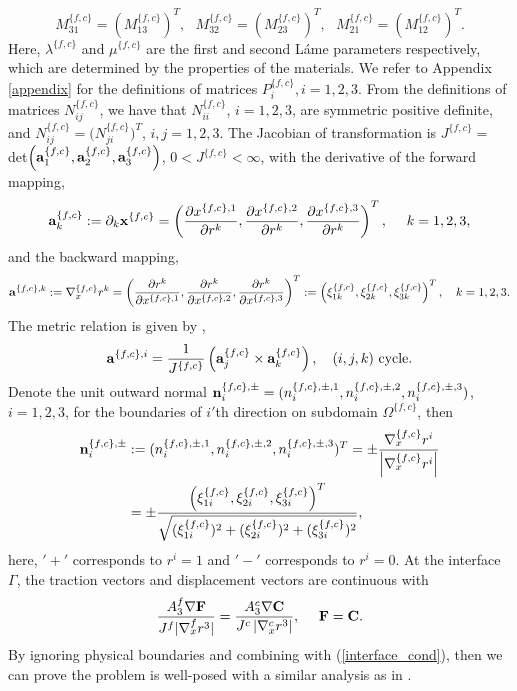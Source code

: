 \[ M_{31}^{\{f,c\}} = (M_{13}^{\{f,c\}})^T, \ \ \  M_{32}^{\{f,c\}} =(M_{23}^{\{f,c\}})^T, \ \ \ M_{21}^{\{f,c\}} =(M_{12}^{\{f,c\}})^T.\]
Here, $\lambda^{\{f,c\}}$ and $\mu^{\{f,c\}}$ are the first and second L{\' {a}}me parameters respectively, which are determined by the properties of the materials. We refer to Appendix \ref{appendix} for the definitions of matrices $P_i^{\{f,c\}}, i = 1,2,3$. From the definitions of matrices $N_{ij}^{\{f,c\}}$, we have that $N_{ii}^{\{f,c\}}$, $i = 1,2,3$, are symmetric positive definite, and $N_{ij}^{\{f,c\}}=\big(N_{ji}^{\{f,c\}}\big)^T$, $i,j=1,2,3$. The Jacobian of transformation is $J^{\{f,c\}} =$ det$\left({\bf a}^{\{f,c\}}_1,{\bf a}^{\{f,c\}}_2,{\bf a}^{\{f,c\}}_3\right)$, $0<J^{\{f,c\}}<\infty$, with the derivative of the forward mapping, 
\begin{equation*}
{\bf a}_k^{\{f,c\}} := \partial_k{\bf x}^{\{f,c\}}  = \left(\frac{\partial x^{\{f,c\},1}}{\partial r^{k}},\frac{\partial x^{\{f,c\},2}}{\partial r^{k}},\frac{\partial x^{\{f,c\},3}}{\partial r^{k}}\right)^T,\ \ \ \ k = 1,2,3,
\end{equation*}
and the backward mapping,
\begin{equation*}
{\bf a}^{\{f,c\},k} := \nabla_x^{\{f,c\}} r^{k} = \left(\frac{\partial r^{k}}{\partial x^{\{f,c\},1}},\frac{\partial r^{k}}{\partial x^{\{f,c\},2}},\frac{\partial r^{k}}{\partial x^{\{f,c\},3}}\right)^T := \left(\xi_{1k}^{\{f,c\}},\xi_{2k}^{\{f,c\}},\xi_{3k}^{\{f,c\}}\right)^T,\ \ \ k = 1,2,3.
\end{equation*}
 The metric relation is given by \cite{thompson1985numerical},
\begin{equation*}
{\bf a}^{\{f,c\},i} = \frac{1}{J^{\{f,c\}}}\left({\bf a}_j^{\{f,c\}}\times{\bf a}_k^{\{f,c\}}\right), \ \ \ (i,j,k) \ \mbox{cycle}.
\end{equation*}
Denote the unit outward normal ${\bf n}_i^{\{f,c\},\pm} = (n_i^{\{f,c\},\pm,1},n_i^{\{f,c\},\pm,2},n_i^{\{f,c\},\pm,3})$, $i = 1,2,3$, for the boundaries of $i'$th direction on subdomain $\Omega^{\{f,c\}}$, then
\begin{align}\label{outward_normal}
{\bf n}_i^{\{f,c\},\pm} &:= (n^{\{f,c\},\pm,1}_i,n^{\{f,c\},\pm,2}_i,n^{\{f,c\},\pm,3}_i)^T = \pm \frac{\nabla_x^{\{f,c\}} r^{i}}{\left|\nabla_x^{\{f,c\}} r^{i}\right|} \nonumber\\
&= \pm\frac{ \left(\xi_{1i}^{\{f,c\}},\xi_{2i}^{\{f,c\}},\xi_{3i}^{\{f,c\}}\right)^T}{\sqrt{(\xi_{1i}^{\{f,c\}})^2+(\xi_{2i}^{\{f,c\}})^2+(\xi_{3i}^{\{f,c\}})^2}},
\end{align}
here, $'+'$ corresponds to $r^{i} = 1$ and $'-'$ corresponds to $r^{i} = 0$.  At the interface $\Gamma$, the traction vectors and displacement vectors are continuous with
\begin{equation}\label{interface_cond}
\frac{A_3^f\nabla{\bf F}}{J^f|\nabla_x^f r^{3}|}  = \frac{A_3^c\nabla{\bf C}}{J^c\left|\nabla_x^c r^{3}\right|}, \ \ \ \ {\bf F} = {\bf C}.
\end{equation}
By ignoring physical boundaries and combining with (\ref{interface_cond}), then we can prove the problem is well-posed with a similar analysis as in \cite{duru2014stable, petersson2015wave}.


